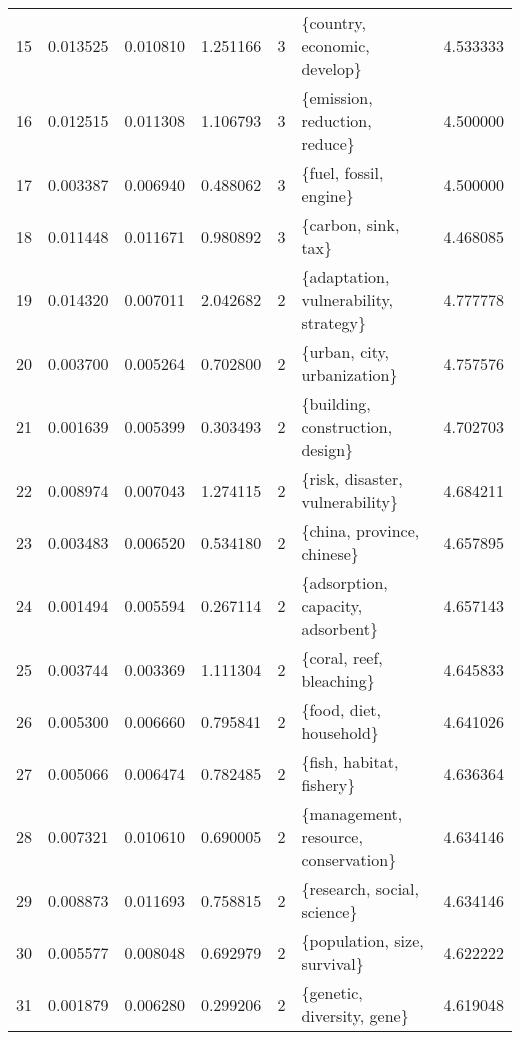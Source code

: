 \begin{tabular}{lrrrrlr}
15  &    0.013525 &  0.010810 &        1.251166 &           3 &            \{country, economic, develop\} &  4.533333 \\
16  &    0.012515 &  0.011308 &        1.106793 &           3 &           \{emission, reduction, reduce\} &  4.500000 \\
17  &    0.003387 &  0.006940 &        0.488062 &           3 &                  \{fuel, fossil, engine\} &  4.500000 \\
18  &    0.011448 &  0.011671 &        0.980892 &           3 &                     \{carbon, sink, tax\} &  4.468085 \\
19  &    0.014320 &  0.007011 &        2.042682 &           2 &   \{adaptation, vulnerability, strategy\} &  4.777778 \\
20  &    0.003700 &  0.005264 &        0.702800 &           2 &             \{urban, city, urbanization\} &  4.757576 \\
21  &    0.001639 &  0.005399 &        0.303493 &           2 &        \{building, construction, design\} &  4.702703 \\
22  &    0.008974 &  0.007043 &        1.274115 &           2 &         \{risk, disaster, vulnerability\} &  4.684211 \\
23  &    0.003483 &  0.006520 &        0.534180 &           2 &              \{china, province, chinese\} &  4.657895 \\
24  &    0.001494 &  0.005594 &        0.267114 &           2 &       \{adsorption, capacity, adsorbent\} &  4.657143 \\
25  &    0.003744 &  0.003369 &        1.111304 &           2 &                \{coral, reef, bleaching\} &  4.645833 \\
26  &    0.005300 &  0.006660 &        0.795841 &           2 &                 \{food, diet, household\} &  4.641026 \\
27  &    0.005066 &  0.006474 &        0.782485 &           2 &                \{fish, habitat, fishery\} &  4.636364 \\
28  &    0.007321 &  0.010610 &        0.690005 &           2 &    \{management, resource, conservation\} &  4.634146 \\
29  &    0.008873 &  0.011693 &        0.758815 &           2 &             \{research, social, science\} &  4.634146 \\
30  &    0.005577 &  0.008048 &        0.692979 &           2 &            \{population, size, survival\} &  4.622222 \\
31  &    0.001879 &  0.006280 &        0.299206 &           2 &              \{genetic, diversity, gene\} &  4.619048 \\

\end{tabular}
